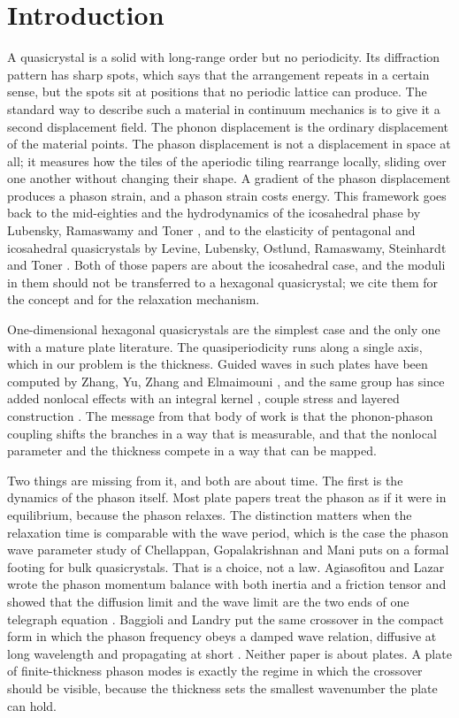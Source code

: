\documentclass[11pt]{article}
\begin{document}
\section{Introduction}

A quasicrystal is a solid with long-range order but no periodicity. Its diffraction pattern has sharp spots,
which says that the arrangement repeats in a certain sense, but the spots sit at positions that no periodic
lattice can produce. The standard way to describe such a material in continuum mechanics is to give it a
second displacement field. The phonon displacement is the ordinary displacement of the material points. The
phason displacement is not a displacement in space at all; it measures how the tiles of the aperiodic tiling
rearrange locally, sliding over one another without changing their shape. A gradient of the phason
displacement produces a phason strain, and a phason strain costs energy. This framework goes back to the
mid-eighties and the hydrodynamics of the icosahedral phase by Lubensky, Ramaswamy and Toner
\cite{Lubensky1985}, and to the elasticity of pentagonal and icosahedral quasicrystals by Levine, Lubensky,
Ostlund, Ramaswamy, Steinhardt and Toner \cite{Levine1985}. Both of those papers are about the icosahedral
case, and the moduli in them should not be transferred to a hexagonal quasicrystal; we cite them for the
concept and for the relaxation mechanism.

One-dimensional hexagonal quasicrystals are the simplest case and the only one with a mature plate
literature. The quasiperiodicity runs along a single axis, which in our problem is the thickness. Guided
waves in such plates have been computed by Zhang, Yu, Zhang and Elmaimouni \cite{Zhang2021}, and the same
group has since added nonlocal effects with an integral kernel \cite{Wang2025}, couple stress \cite{Wang2022}
and layered construction \cite{Wang2025b}. The message from that body of work is that the phonon-phason
coupling shifts the branches in a way that is measurable, and that the nonlocal parameter and the thickness
compete in a way that can be mapped.

Two things are missing from it, and both are about time. The first is the dynamics of the phason itself.
Most plate papers treat the phason as if it were in equilibrium, because the phason relaxes. The
distinction matters when the relaxation time is comparable with the wave period, which is the case the
phason wave parameter study of Chellappan, Gopalakrishnan and Mani \cite{Chellappan2015} puts on a formal
footing for bulk quasicrystals. That is a
choice, not a law. Agiasofitou and Lazar wrote the phason momentum balance with both inertia and a friction
tensor and showed that the diffusion limit and the wave limit are the two ends of one telegraph equation
\cite{Agiasofitou2014}. Baggioli and Landry put the same crossover in the compact form in which the phason
frequency obeys a damped wave relation, diffusive at long wavelength and propagating at short
\cite{Baggioli2020}. Neither paper is about plates. A plate of finite-thickness phason modes is exactly the
regime in which the crossover should be visible, because the thickness sets the smallest wavenumber the
plate can hold.
\end{document}
